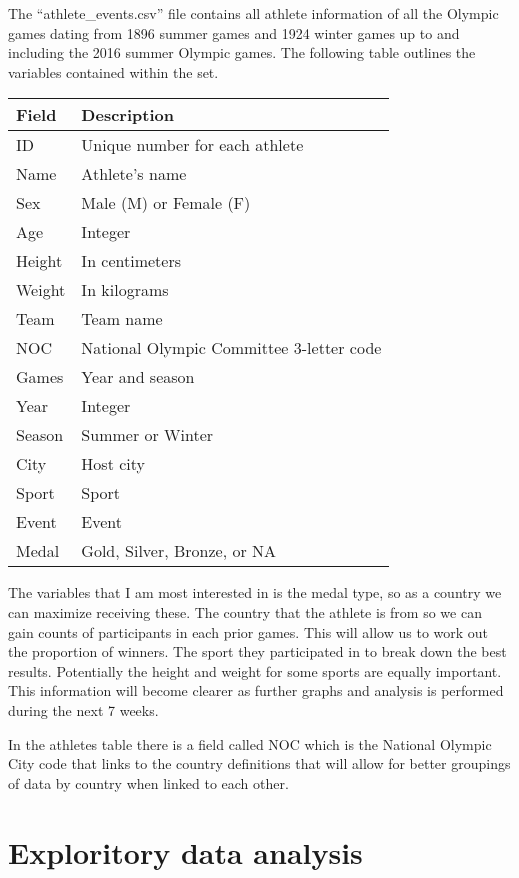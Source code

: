 \documentclass[
]{article}
\begin{document}
The ``athlete\_events.csv'' file contains all athlete information of all
the Olympic games dating from 1896 summer games and 1924 winter games up
to and including the 2016 summer Olympic games. The following table
outlines the variables contained within the set.

\begin{tabular}{l|l}
\hline
Field & Description\\
\hline
ID & Unique number for each athlete\\
\hline
Name & Athlete's name\\
\hline
Sex & Male (M) or Female (F)\\
\hline
Age & Integer\\
\hline
Height & In centimeters\\
\hline
Weight & In kilograms\\
\hline
Team & Team name\\
\hline
NOC & National Olympic Committee 3-letter code\\
\hline
Games & Year and season\\
\hline
Year & Integer\\
\hline
Season & Summer or Winter\\
\hline
City & Host city\\
\hline
Sport & Sport\\
\hline
Event & Event\\
\hline
Medal & Gold, Silver, Bronze, or NA\\
\hline
\end{tabular}

The variables that I am most interested in is the medal type, so as a
country we can maximize receiving these. The country that the athlete is
from so we can gain counts of participants in each prior games. This
will allow us to work out the proportion of winners. The sport they
participated in to break down the best results. Potentially the height
and weight for some sports are equally important. This information will
become clearer as further graphs and analysis is performed during the
next 7 weeks.

In the athletes table there is a field called NOC which is the National
Olympic City code that links to the country definitions that will allow
for better groupings of data by country when linked to each other.

\section{Exploritory data analysis}\label{exploritory-data-analysis}
\end{document}
